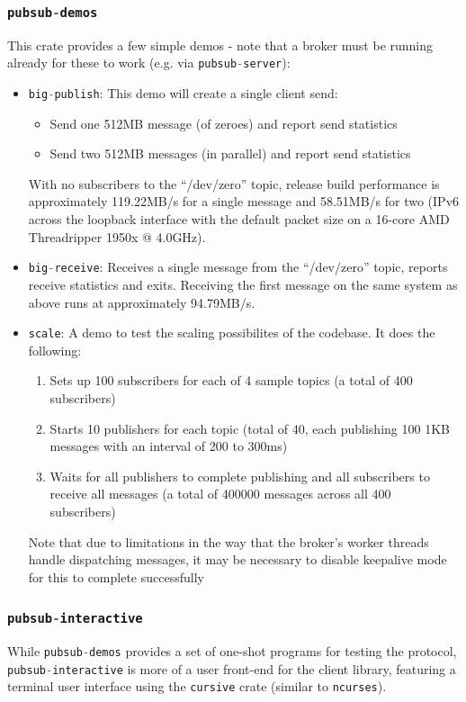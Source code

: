 \documentclass[a4paper]{article}
\numberwithin{figure}{section}
\numberwithin{table}{section}
\newcommand{\mi}{\mintinline}
\begin{document}
\subsubsection{\mi{c}{pubsub-demos}}
This crate provides a few simple demos - note that a broker must be running already for these to work (e.g. via \mi{c}{pubsub-server}):
\begin{itemize}
	\item \mi{c}{big-publish}: This demo will create a single client send:
		\begin{itemize}
			\item Send one 512MB message (of zeroes) and report send statistics
			\item Send two 512MB messages (in parallel) and report send statistics
		\end{itemize}
		With no subscribers to the ``/dev/zero'' topic, release build performance is approximately 119.22MB/s for a single message and 58.51MB/s for two (IPv6 across the loopback interface with the default packet size on a 16-core AMD Threadripper 1950x @ 4.0GHz).

	\item \mi{c}{big-receive}: Receives a single message from the ``/dev/zero'' topic, reports receive statistics and exits. Receiving the first message on the same system as above runs at approximately 94.79MB/s.
	\item \mi{c}{scale}: A demo to test the scaling possibilites of the codebase. It does the following:
		\begin{enumerate}
			\item Sets up 100 subscribers for each of 4 sample topics (a total of 400 subscribers)
			\item Starts 10 publishers for each topic (total of 40, each publishing 100 1KB messages with an interval of 200 to 300ms)
			\item Waits for all publishers to complete publishing and all subscribers to receive all messages (a total of 400000 messages across all 400 subscribers)
		\end{enumerate}
	Note that due to limitations in the way that the broker's worker threads handle dispatching messages, it may be necessary to disable keepalive mode for this to complete successfully
\end{itemize}

\subsubsection{\mi{c}{pubsub-interactive}}
While \mi{c}{pubsub-demos} provides a set of one-shot programs for testing the protocol, \mi{c}{pubsub-interactive} is more of a user front-end for the client library, featuring a terminal user interface using the \mi{rust}{cursive} crate (similar to \mi{c}{ncurses}).
\end{document}
